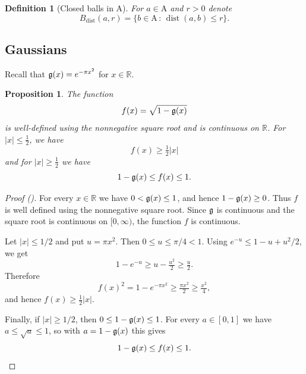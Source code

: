 \documentclass[12pt,reqno]{amsart}
\newcommand{\auto}{{({\tiny\faCar})}}
\theoremstyle{plain}
\newtheorem{proposition}[theorem]{Proposition}
\newtheorem{definition}[theorem]{Definition}
\numberwithin{equation}{section}
\theoremstyle{remark}
\newcommand{\uses}[1]{}
\newcommand{\usesdefs}[1]{}
\newcommand{\R}{{\mathbb R}}
\DeclareMathOperator{\dist}{dist}
\begin{document}
\begin{definition}[Closed balls in $\mathrm{A}$]\label{closed balls in A}\uses{}\usesdefs{multiplicatively spaced monotone sequences,Distance of spaced sequences}
For $a\in\mathrm{A}$ and $r>0$ denote
\begin{equation}\label{auto:spaced-sequence-distance-ball}B_{\mathrm{dist}}(a,r)=\{b\in\mathrm{A}\,:\,\dist(a,b)\le r\}.\end{equation}
\end{definition}

\subsection{Gaussians}

Recall that $\mathfrak{g}(x)=e^{-\pi x^2}$ for $x\in\R$.

\begin{proposition}\label{square root one minus Gaussian}\uses{}\usesdefs{gaussian}
    The function
    \begin{equation}\label{auto:square-root-one-minus-Gaussian}
        f(x)=\sqrt{1-\mathfrak{g}(x)}
    \end{equation}
    is well-defined
    using the nonnegative square root and is continuous on $\R$.
    For $|x|\le \frac 12$, we have
    \begin{equation}\label{auto:square-root-one-minus-Gaussian-small-lower-bound}
        f(x)\ge \tfrac 12 |x|
    \end{equation}
    and for $|x|\ge \frac 12$ we have
 \begin{equation}\label{auto:square-root-one-minus-Gaussian-large-bounds}
        1-\mathfrak{g}(x)\le f(x)\le 1.
    \end{equation}
\end{proposition}
\begin{proof}[Proof \auto]
For every $x\in\R$ we have $0<\mathfrak{g}(x)\le 1$, and hence
$1-\mathfrak{g}(x)\ge 0$. Thus $f$ is well defined using the nonnegative square
root. Since $\mathfrak{g}$ is continuous and the square root is continuous on
$[0,\infty)$, the function $f$ is continuous.

Let $|x|\le 1/2$ and put $u=\pi x^2$. Then $0\le u\le \pi/4<1$. Using
$e^{-u}\le 1-u+u^2/2$, we get
\[
1-e^{-u}\ge u-\tfrac{u^2}{2}\ge \tfrac u2 .
\]
Therefore
\[
f(x)^2=1-e^{-\pi x^2}\ge \tfrac{\pi x^2}{2}\ge \tfrac{x^2}{4},
\]
and hence $f(x)\ge \frac12 |x|$.

Finally, if $|x|\ge 1/2$, then $0\le 1-\mathfrak{g}(x)\le 1$. For every
$a\in[0,1]$ we have $a\le \sqrt a\le 1$, so with $a=1-\mathfrak{g}(x)$ this gives
\[
1-\mathfrak{g}(x)\le f(x)\le 1 .
\]
\end{proof}
\end{document}
